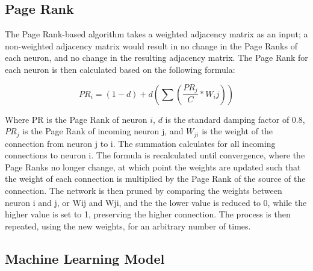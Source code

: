 \documentclass[11pt]{article}
\begin{document}
\subsection{Page Rank}
The Page Rank-based algorithm takes a weighted adjacency matrix as an input; a non-weighted adjacency matrix would result in no change in the Page Ranks of each neuron, and no change in the resulting adjacency matrix. The Page Rank for each neuron is then calculated based on the following formula:

$$PR_i = (1-d)+d(\sum(\frac{PR_j}{C} * W_ij))$$

Where PR is the Page Rank of neuron $i$, $d$ is the standard damping factor of 0.8, $PR_j$ is the Page Rank of incoming neuron j, and $W_{ji}$ is the weight of the connection from neuron j to i. The summation calculates for all incoming connections to neuron i. The formula is recalculated until convergence, where the Page Ranks no longer change, at which point the weights are updated such that the weight of each connection is multiplied by the Page Rank of the source of the connection. The network is then pruned by comparing the weights between neuron i and j, or Wij and Wji, and the the lower value is reduced to 0, while the higher value is set to 1, preserving the higher connection. The process is then repeated, using the new weights, for an arbitrary number of times.\par

\subsection{Machine Learning Model}
\end{document}
